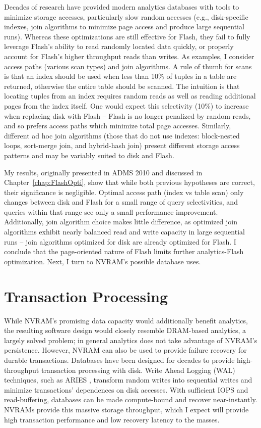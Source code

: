 Decades of research have provided modern analytics databases with tools to minimize storage accesses, particularly slow random accesses (e.g., disk-specific indexes, join algorithms to minimize page access and produce large sequential runs).
Whereas these optimizations are still effective for Flash, they fail to fully leverage Flash's ability to read randomly located data quickly, or properly account for Flash's higher throughput reads than writes.
As examples, I consider access paths (various scan types) and join algorithms.
A rule of thumb for scans is that an index should be used when less than 10\% of tuples in a table are returned, otherwise the entire table should be scanned.
The intuition is that locating tuples from an index requires random reads as well as reading additional pages from the index itself.
One would expect this selectivity (10\%) to increase when replacing disk with Flash -- Flash is no longer penalized by random reads, and so prefers access paths which minimize total page accesses.
Similarly, different ad hoc join algorithms (those that do not use indexes: block-nested loops, sort-merge join, and hybrid-hash join) present different storage access patterns and may be variably suited to disk and Flash.

My results, originally presented in ADMS 2010 \cite{PelleyWenisch11} and discussed in Chapter~\ref{chap:FlashOpti}, show that while both previous hypotheses are correct, their significance is negligible.
Optimal access path (index vs table scan) only changes between disk and Flash for a small range of query selectivities, and queries within that range see only a small performance improvement.
Additionally, join algorithm choice makes little difference, as optimized join algorithms exhibit nearly balanced read and write capacity in large sequential runs -- join algorithms optimized for disk are already optimized for Flash.
I conclude that the page-oriented nature of Flash limits further analytics-Flash optimization.
Next, I turn to NVRAM's possible database uses.

\section{Transaction Processing}
\label{sec:Intro:OLTP}

While NVRAM's promising data capacity would additionally benefit analytics, the resulting software design would closely resemble DRAM-based analytics, a largely solved problem; in general analytics does not take advantage of NVRAM's persistence.
However, NVRAM can also be used to provide failure recovery for durable transactions.
Databases have been designed for decades to provide high-throughput transaction processing with disk.
Write Ahead Logging (WAL) techniques, such as ARIES \cite{MohanHaderle92}, transform random writes into sequential writes and minimize transactions' dependences on disk accesses.
With sufficient IOPS and read-buffering, databases can be made compute-bound and recover near-instantly.
NVRAMs provide this massive storage throughput, which I expect will provide high transaction performance and low recovery latency to the masses.

